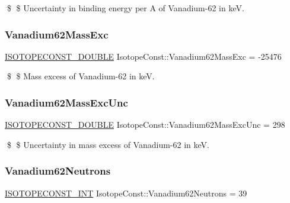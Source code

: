 \$ \$ Uncertainty in binding energy per A of Vanadium-\/62 in keV. \mbox{\label{group___isotope_const-_vanadium-_v62_ga413c97d697fb0aa888dd4711de30239e}} 
\subsubsection{\texorpdfstring{Vanadium62\+Mass\+Exc}{Vanadium62MassExc}}
{\footnotesize\ttfamily \mbox{\hyperlink{group___isotope_const-_macros_ga8f45a7272ce02c0b4c65c44636ed719a}{I\+S\+O\+T\+O\+P\+E\+C\+O\+N\+S\+T\+\_\+\+D\+O\+U\+B\+LE}} Isotope\+Const\+::\+Vanadium62\+Mass\+Exc = -\/25476}

\$ \$ Mass excess of Vanadium-\/62 in keV. \mbox{\label{group___isotope_const-_vanadium-_v62_ga6d879d455e874fb816163a0930274d02}} 
\subsubsection{\texorpdfstring{Vanadium62\+Mass\+Exc\+Unc}{Vanadium62MassExcUnc}}
{\footnotesize\ttfamily \mbox{\hyperlink{group___isotope_const-_macros_ga8f45a7272ce02c0b4c65c44636ed719a}{I\+S\+O\+T\+O\+P\+E\+C\+O\+N\+S\+T\+\_\+\+D\+O\+U\+B\+LE}} Isotope\+Const\+::\+Vanadium62\+Mass\+Exc\+Unc = 298}

\$ \$ Uncertainty in mass excess of Vanadium-\/62 in keV. \mbox{\label{group___isotope_const-_vanadium-_v62_gad43ed21a2dc1cbc2225e058b37c8a61f}} 
\subsubsection{\texorpdfstring{Vanadium62\+Neutrons}{Vanadium62Neutrons}}
{\footnotesize\ttfamily \mbox{\hyperlink{group___isotope_const-_macros_ga5f18360b3e99483a35c32d789e62621c}{I\+S\+O\+T\+O\+P\+E\+C\+O\+N\+S\+T\+\_\+\+I\+NT}} Isotope\+Const\+::\+Vanadium62\+Neutrons = 39}

